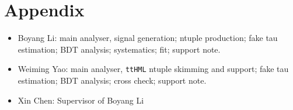 \documentclass[UKenglish,texlive=2015]{\ATLASLATEXPATH atlasdoc}
\begin{document}
\maketitle

\tableofcontents


\tableofcontents
\newpage

\linenumbers










\clearpage
\appendix
\part*{Appendix}

%
%
%
%
%
%
%
%
\clearpage

\printbibliography
%
%

\clearpage
{}

\begin{itemize}
\item Boyang Li: main analyser, signal generation; ntuple production; fake tau estimation; BDT analysis; systematics; fit; support note.
\item Weiming Yao: main analyser, \texttt{ttHML} ntuple skimming and support; fake tau estimation; BDT analysis; cross check; support note.
\item Xin Chen: Supervisor of Boyang Li
\end{itemize}
\end{document}
